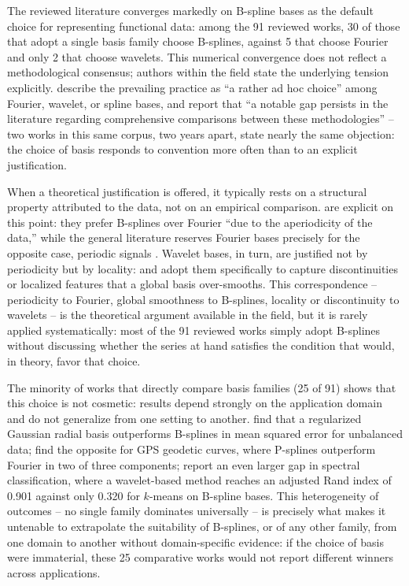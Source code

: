 The reviewed literature converges markedly on B-spline bases as the
default choice for representing functional data: among the 91 reviewed
works, 30 of those that adopt a single basis family choose B-splines,
against 5 that choose Fourier and only 2 that choose wavelets. This
numerical convergence does not reflect a methodological consensus;
authors within the field state the underlying tension explicitly.
\cite{basna_driven_2022} describe the prevailing practice as ``a rather
ad hoc choice'' among Fourier, wavelet, or spline bases, and
\cite{eslami_spline_2024} report that ``a notable gap persists in the
literature regarding comprehensive comparisons between these
methodologies'' -- two works in this same corpus, two years apart, state
nearly the same objection: the choice of basis responds to convention
more often than to an explicit justification.

When a theoretical justification is offered, it typically rests on a
structural property attributed to the data, not on an empirical
comparison. \cite{shackleton_comparing_2024} are explicit on this point:
they prefer B-splines over Fourier ``due to the aperiodicity of the
data,'' while the general literature reserves Fourier bases precisely
for the opposite case, periodic signals \cite{nassar_empirically_2021}.
Wavelet bases, in turn, are justified not by periodicity but by
locality: \cite{yang_feature_2022} and \cite{amato_unsupervised_2025}
adopt them specifically to capture discontinuities or localized features
that a global basis over-smooths. This correspondence -- periodicity to
Fourier, global smoothness to B-splines, locality or discontinuity to
wavelets -- is the theoretical argument available in the field, but it
is rarely applied systematically: most of the 91 reviewed works simply
adopt B-splines without discussing whether the series at hand satisfies
the condition that would, in theory, favor that choice.

The minority of works that directly compare basis families (25 of 91)
shows that this choice is not cosmetic: results depend strongly on the
application domain and do not generalize from one setting to another.
\cite{kayano_principal_2009} find that a regularized Gaussian radial
basis outperforms B-splines in mean squared error for unbalanced data;
\cite{perezplaza_network_2018} find the opposite for GPS geodetic
curves, where P-splines outperform Fourier in two of three components;
\cite{amato_unsupervised_2025} report an even larger gap in spectral
classification, where a wavelet-based method reaches an adjusted Rand
index of 0.901 against only 0.320 for $k$-means on B-spline bases. This
heterogeneity of outcomes -- no single family dominates universally --
is precisely what makes it untenable to extrapolate the suitability of
B-splines, or of any other family, from one domain to another without
domain-specific evidence: if the choice of basis were immaterial, these
25 comparative works would not report different winners across
applications.


